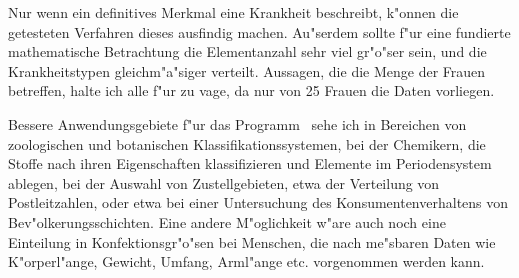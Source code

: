 Nur wenn ein definitives Merkmal eine Krankheit beschreibt, 
k"onnen die getesteten Verfahren dieses ausfindig machen.
Au"serdem sollte f"ur eine fundierte mathematische Betrachtung die
Elementanzahl sehr viel gr"o"ser sein, und die Krankheitstypen
gleichm"a"siger verteilt. Aussagen, die die Menge der Frauen betreffen,
halte ich alle f"ur zu vage, da nur von 25 Frauen die Daten vorliegen.

Bessere Anwendungsgebiete f"ur das Programm \Clustering\ sehe ich
in Bereichen von zoologischen und botanischen Klassifikationssystemen,
bei der Chemikern, die Stoffe nach ihren Eigenschaften klassifizieren
und Elemente im Periodensystem ablegen, bei der Auswahl von Zustellgebieten,
etwa der Verteilung von Postleitzahlen, oder etwa bei einer Untersuchung
des Konsumentenverhaltens von Bev"olkerungsschichten.
Eine andere M"oglichkeit w"are auch noch eine Einteilung in 
Konfektionsgr"o"sen bei Menschen, die nach me"sbaren Daten wie K"orperl"ange,
Gewicht, Umfang, Arml"ange etc. vorgenommen werden kann.


